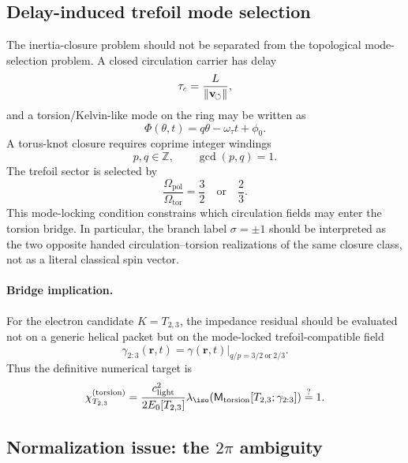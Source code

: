 \subsection{Delay-induced trefoil mode selection}
\label{subsec:ctim-delay-trefoil}

The inertia-closure problem should not be separated from the topological mode-selection problem.  A closed circulation carrier has delay
\begin{equation}
    \tau_c=\frac{L}{\lVert\mathbf{v}_{\!\boldsymbol{\circlearrowleft}}\rVert},
\end{equation}
and a torsion/Kelvin-like mode on the ring may be written as
\begin{equation}
    \Phi(\theta,t)=q\theta-\omega_\tau t+\phi_0.
\end{equation}
A torus-knot closure requires coprime integer windings
\begin{equation}
    p,q\in\mathbb Z,
    \qquad
    \gcd(p,q)=1.
\end{equation}
The trefoil sector is selected by
\begin{equation}
    \frac{\Omega_{\mathrm{pol}}}{\Omega_{\mathrm{tor}}}
    =
    \frac{3}{2}
    \quad\text{or}\quad
    \frac{2}{3}.
\end{equation}
This mode-locking condition constrains which circulation fields may enter the torsion bridge.  In particular, the branch label \(\sigma=\pm1\) should be interpreted as the two opposite handed circulation--torsion realizations of the same closure class, not as a literal classical spin vector.

\paragraph{Bridge implication.}
For the electron candidate \(K=T_{2,3}\), the impedance residual should be evaluated not on a generic helical packet but on the mode-locked trefoil-compatible field
\begin{equation}
    \gamma_{2{:}3}(\mathbf r,t)
    =
    \gamma(\mathbf r,t)\Big|_{q/p=3/2\ \mathrm{or}\ 2/3}.
\end{equation}
Thus the definitive numerical target is
\begin{equation}
    \chi_{T_{2,3}}^{(\torsion)}
    =
    \frac{\clight^2}{2E_0[T_{2,3}]}
    \lambda_{\iso}\!\left(\mathsf M_{\torsion}[T_{2,3};\gamma_{2{:}3}]\right)
    \stackrel{?}{=}1.
    \label{eq:ctim-trefoil-target}
\end{equation}

\subsection{Normalization issue: the \texorpdfstring{\(2\pi\)}{2pi} ambiguity}
\label{subsec:ctim-2pi}

